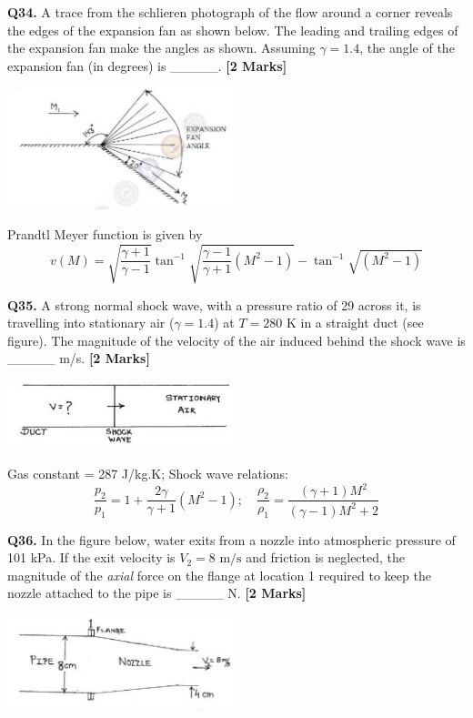 \documentclass[11pt]{article}
\newcommand{\questionb}[2]{
    \noindent\textbf{Q#2.} #1 \hfill \textbf{[2 Marks]}
}
\begin{document}
\vspace{0.5cm}

\questionb{A trace from the schlieren photograph of the flow around a corner reveals the edges of the expansion fan as shown below. The leading and trailing edges of the expansion fan make the angles as shown. Assuming $ \gamma = 1.4 $, the angle of the expansion fan (in degrees) is \_\_\_\_\_.}{34}
\begin{center}
\includegraphics[width=0.5\textwidth]{figures/34.png}
\end{center}

\vspace{0.2cm}
Prandtl Meyer function is given by
\[
v(M) = \sqrt{\frac{\gamma + 1}{\gamma - 1}} \tan^{-1} \sqrt{\frac{\gamma - 1}{\gamma + 1}(M^2 - 1)} - \tan^{-1}\sqrt{(M^2 - 1)}
\]

\vspace{0.5cm}

\questionb{A strong normal shock wave, with a pressure ratio of 29 across it, is travelling into stationary air ($ \gamma = 1.4 $) at $ T = 280 \text{ K} $ in a straight duct (see figure). The magnitude of the velocity of the air induced behind the shock wave is \_\_\_\_\_ m/s.}{35}
\begin{center}
\includegraphics[width=0.5\textwidth]{figures/35.png}
\end{center}

\vspace{0.2cm}
Gas constant = 287 J/kg.K; Shock wave relations:
\[
\frac{p_2}{p_1} = 1 + \frac{2\gamma}{\gamma + 1}(M^2 - 1); \quad
\frac{\rho_2}{\rho_1} = \frac{(\gamma + 1)M^2}{(\gamma - 1)M^2 + 2}
\]

\vspace{0.5cm}

\questionb{In the figure below, water exits from a nozzle into atmospheric pressure of 101 kPa. If the exit velocity is $V_2 = 8 \text{ m/s}$ and friction is neglected, the magnitude of the \textit{axial} force on the flange at location 1 required to keep the nozzle attached to the pipe is \_\_\_\_\_ N.}{36}
\begin{center}
\includegraphics[width=0.5\textwidth]{figures/36.png}
\end{center}
\end{document}
